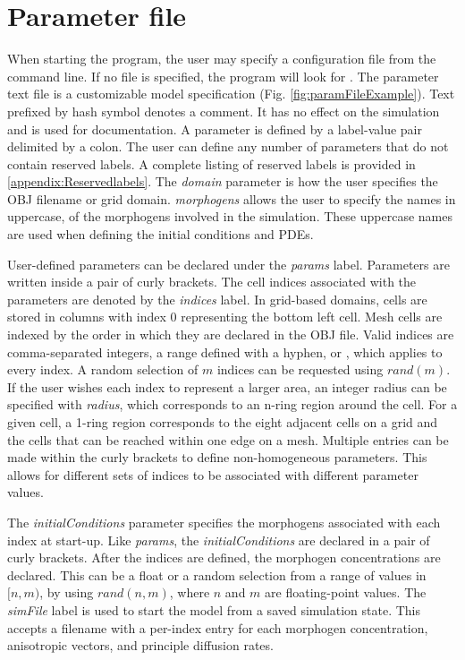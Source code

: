 \section{Parameter file}
When starting the program, the user may specify a configuration file from the command line. If no file is specified, the program will look for . The parameter text file is a customizable model specification (Fig. \ref{fig:paramFileExample}). Text prefixed by hash symbol denotes a comment. It has no effect on the simulation and is used for documentation. A parameter is defined by a label-value pair delimited by a colon. The user can define any number of parameters that do not contain reserved labels. A complete listing of reserved labels is provided in \ref{appendix:Reservedlabels}. The \textit{domain} parameter is how the user specifies the OBJ filename or grid domain. \textit{morphogens} allows the user to specify the names in uppercase, of the morphogens involved in the simulation. These uppercase names are used when defining the initial conditions and PDEs.

User-defined parameters can be declared under the \textit{params} label. Parameters are written inside a pair of curly brackets. The cell indices associated with the parameters are denoted by the \textit{indices} label. In grid-based domains, cells are stored in columns with index 0 representing the bottom left cell. Mesh cells are indexed by the order in which they are declared in the OBJ file. Valid indices are comma-separated integers, a range defined with a hyphen, or , which applies to every index. A random selection of $m$ indices can be requested using $rand(m)$. If the user wishes each index to represent a larger area, an integer radius can be specified with \textit{radius}, which corresponds to an n-ring region around the cell. For a given cell, a 1-ring region corresponds to the eight adjacent cells on a grid and the cells that can be reached within one edge on a mesh. Multiple entries can be made within the curly brackets to define non-homogeneous parameters. This allows for different sets of indices to be associated with different parameter values.

The \textit{initialConditions} parameter specifies the morphogens associated with each index at start-up. Like \textit{params}, the \textit{initialConditions} are declared in a pair of curly brackets. After the indices are defined, the morphogen concentrations are declared. This can be a float or a random selection from a range of values in $[n, m)$, by using $rand(n, m)$, where $n$ and $m$ are floating-point values. The \textit{simFile} label is used to start the model from a saved simulation state. This accepts a filename with a per-index entry for each morphogen concentration, anisotropic vectors, and principle diffusion rates.

